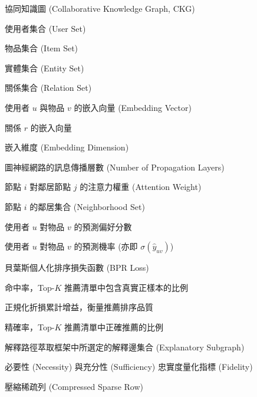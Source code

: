 
\begin{denotation}[4cm]

\item[$\mathcal{G}$]{
  協同知識圖 (Collaborative Knowledge Graph, CKG)
}

\item[$\mathcal{U}$]{
  使用者集合 (User Set)
}

\item[$\mathcal{V}$]{
  物品集合 (Item Set)
}

\item[$\mathcal{E}$]{
  實體集合 (Entity Set)
}

\item[$\mathcal{R}$]{
  關係集合 (Relation Set)
}

\item[$\bm{e}_u, \bm{e}_v$]{
  使用者 $u$ 與物品 $v$ 的嵌入向量 (Embedding Vector)
}

\item[$\bm{e}_r$]{
  關係 $r$ 的嵌入向量
}

\item[$d$]{
  嵌入維度 (Embedding Dimension)
}

\item[$L$]{
  圖神經網路的訊息傳播層數 (Number of Propagation Layers)
}

\item[$\alpha_{ij}$]{
  節點 $i$ 對鄰居節點 $j$ 的注意力權重 (Attention Weight)
}

\item[$\mathcal{N}_i$]{
  節點 $i$ 的鄰居集合 (Neighborhood Set)
}

\item[$\hat{y}_{uv}$]{
  使用者 $u$ 對物品 $v$ 的預測偏好分數
}

\item[$p_{uv}$]{
  使用者 $u$ 對物品 $v$ 的預測機率 (亦即 $\sigma(\hat{y}_{uv})$)
}

\item[$\mathcal{L}_{\text{BPR}}$]{
  貝葉斯個人化排序損失函數 (BPR Loss)
}

\item[HR@$K$]{
  命中率，Top-$K$ 推薦清單中包含真實正樣本的比例
}

\item[NDCG@$K$]{
  正規化折損累計增益，衡量推薦排序品質
}

\item[P@$K$]{
  精確率，Top-$K$ 推薦清單中正確推薦的比例
}

\item[$S$]{
  解釋路徑萃取框架中所選定的解釋邊集合 (Explanatory Subgraph)
}

\item[$F^+, F^-$]{
  必要性 (Necessity) 與充分性 (Sufficiency) 忠實度量化指標 (Fidelity)
}

\item[CSR]{
  壓縮稀疏列 (Compressed Sparse Row)
}

\end{denotation}
